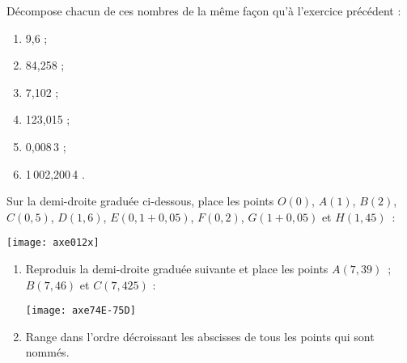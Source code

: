 \begin{exercice}
Décompose chacun de ces nombres de la même façon qu'à l'exercice précédent :
\begin{enumerate} 
 \item 9,6 \dotfill ; \hspace*{13em}
 
 \item 84,258 \dotfill ; \hspace*{13em}
 
 \item 7,102 \dotfill ; \hspace*{13em}
 
 \item 123,015 \dotfill ; \hspace*{13em}
 
 \item 0,008\,3 \dotfill ; \hspace*{13em}
 
 \item 1\,002,200\,4 \dotfill. \hspace*{13em}
 
 \end{enumerate}
\end{exercice}


\begin{exercice}
Sur la demi-droite graduée ci-dessous, place les points $O(0)$, $A(1)$, $B(2)$, $C(0,5)$, $D(1,6)$, $E(0,1 + 0,05)$, $F(0,2)$, $G(1 + 0,05)$ et $H(1,45)$ :
\begin{center} \texttt{[image: axe012x]} \end{center}
\end{exercice}



\begin{exercice}
\begin{enumerate}
 \item Reproduis la demi-droite graduée suivante et place les points $A(7,39)$ ; $B(7,46)$ et $C(7,425)$ :
\begin{center} \texttt{[image: axe74E-75D]} \end{center}
 \item Range dans l'ordre décroissant les abscisses de tous les points qui sont nommés.
 \end{enumerate}
\end{exercice}



